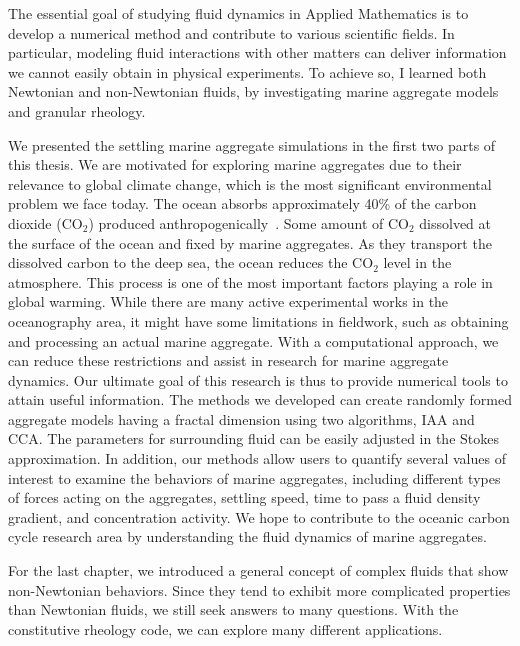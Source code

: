 The essential goal of studying fluid dynamics in Applied Mathematics is to develop a numerical method and contribute to various scientific fields. In particular, modeling fluid interactions with other matters can deliver information we cannot easily obtain in physical experiments. To achieve so, I learned both Newtonian and non-Newtonian fluids, by investigating marine aggregate models and granular rheology.
\par
We presented the settling marine aggregate simulations in the first two parts of this thesis. 
We are motivated for exploring marine aggregates due to their relevance to global climate change, which is the most significant environmental problem we face today.
The ocean absorbs approximately 40\% of the carbon dioxide (CO$_2$) produced anthropogenically~\cite{omand_sinking_2020}. 
Some amount of CO$_2$ dissolved at the surface of the ocean and fixed by marine aggregates. As they transport the dissolved carbon to the deep sea, the ocean reduces the CO$_2$ level in the atmosphere. 
This process is one of the most important factors playing a role in global warming.
While there are many active experimental works in the oceanography area, it might have some limitations in fieldwork, such as obtaining and processing an actual marine aggregate. 
With a computational approach, we can reduce these restrictions and assist in research for marine aggregate dynamics. 
Our ultimate goal of this research is thus to provide numerical tools to attain useful information.
The methods we developed can create randomly formed aggregate models having a fractal dimension using two algorithms, IAA and CCA. The parameters for surrounding fluid can be easily adjusted in the Stokes approximation. 
In addition, our methods allow users to quantify several values of interest to examine the behaviors of marine aggregates, including different types of forces acting on the aggregates, settling speed, time to pass a fluid density gradient, and concentration activity.
We hope to contribute to the oceanic carbon cycle research area by understanding the fluid dynamics of marine aggregates. 


For the last chapter, we introduced a general concept of complex fluids that show non-Newtonian behaviors. 
Since they tend to exhibit more complicated properties than Newtonian fluids, we still seek answers to many questions. 
With the constitutive rheology code, we can explore many different applications. 